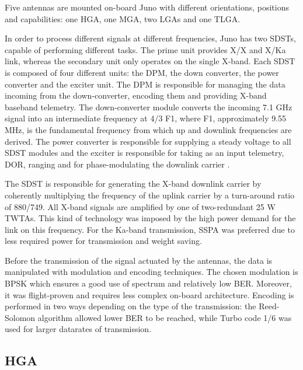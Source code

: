 Five antennas are mounted on-board Juno with different orientations, positions and capabilities: one HGA, one MGA, two LGAs and one TLGA. 

In order to process different signals at different frequencies, Juno has two SDSTs, capable of performing different tasks. The prime unit provides X/X and X/Ka link, whereas the secondary unit only operates on the single X-band. Each SDST is composed of four different units: the DPM, the down converter, the power converter and the exciter unit. 
The DPM is responsible for managing the data incoming from the down-converter, encoding them and providing X-band baseband telemetry. The down-converter module converts the incoming 7.1 GHz signal into an intermediate frequency at 4/3 F1, where F1, approximately 9.55 MHz, is the fundamental frequency from which up and downlink frequencies are derived.
The power converter is responsible for supplying a steady voltage to all SDST modules and the exciter is responsible for taking as an input telemetry, DOR, ranging and for phase-modulating the downlink carrier \cite{ka_uplink} \cite{juno_telecommunication}.

The SDST is responsible for generating the X-band downlink carrier by coherently multiplying the frequency of the uplink carrier by a turn-around ratio of 880/749. All X-band signals are amplified by one of two-redundant 25 W TWTAs\cite{juno_telecommunication}.
This kind of technology was imposed by the high power demand for the link on this frequency. For the Ka-band transmission, SSPA was preferred due to less required power for transmission and weight saving.

Before the transmission of the signal actuated by the antennas, the data is manipulated with modulation and encoding techniques. The chosen modulation is BPSK which ensures a good use of spectrum and relatively low BER. Moreover, it was flight-proven and requires less complex on-board architecture.
Encoding is performed in two ways depending on the type of the transmission: the Reed-Solomon algorithm allowed lower BER to be reached, while Turbo code 1/6 was used for larger datarates of transmission. 

\subsection{HGA}
\label{subsec:hga}



